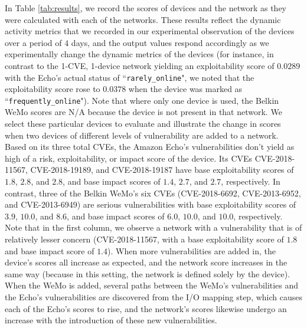 In Table \ref{tab:results}, we record the scores of devices and the network as they were calculated with each of the networks. These results reflect the dynamic activity metrics that we recorded in our experimental observation of the devices over a period of $4$ days, and the output values respond accordingly as we experimentally change the dynamic metrics of the devices (for instance, in contrast to the 1-CVE, 1-device network yielding an exploitability score of $0.0289$ with the Echo's actual status of ``\texttt{rarely\_online}", we noted that the exploitability score rose to $0.0378$ when the device was marked as ``\texttt{frequently\_online}"). Note that where only one device is used, the Belkin WeMo scores are N/A because the device is not present in that network. We select these particular devices to evaluate and illustrate the change in scores when two devices of different levels of vulnerability are added to a network. Based on its three total CVEs, the Amazon Echo's vulnerabilities don't yield as high of a risk, exploitability, or impact score of the device. Its CVEs CVE-2018-11567, CVE-2018-19189, and CVE-2018-19187 have base exploitability scores of $1.8$, $2.8$, and $2.8$, and base impact scores of $1.4$, $2.7$, and $2.7$, respectively. In contrast, three of the Belkin WeMo's six CVEs (CVE-2018-6692, CVE-2013-6952, and CVE-2013-6949) are serious vulnerabilities with base exploitability scores of $3.9$, $10.0$, and $8.6$, and base impact scores of $6.0$, $10.0$, and $10.0$, respectively. Note that in the first column, we observe a network with a vulnerability that is of relatively lesser concern (CVE-2018-11567, with a base exploitability score of $1.8$ and base impact score of $1.4$). When more vulnerabilities are added in, the device's scores all increase as expected, and the network score increases in the same way (because in this setting, the network is defined solely by the device). When the WeMo is added, several paths between the WeMo's vulnerabilities and the Echo's vulnerabilities are discovered from the I/O mapping step, which causes each of the Echo's scores to rise, and the network's scores likewise undergo an increase with the introduction of these new vulnerabilities.

